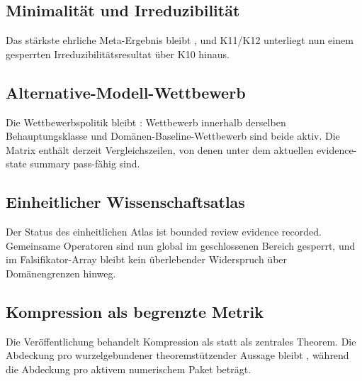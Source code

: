 \subsection{Minimalität und Irreduzibilität}
Das stärkste ehrliche Meta-Ergebnis bleibt , und K11/K12 unterliegt nun einem gesperrten Irreduzibilitätsresultat über K10 hinaus.

\subsection{Alternative-Modell-Wettbewerb}
Die Wettbewerbspolitik bleibt : Wettbewerb innerhalb derselben Behauptungsklasse und Domänen-Baseline-Wettbewerb sind beide aktiv. Die Matrix enthält derzeit  Vergleichszeilen, von denen  unter dem aktuellen evidence-state summary pass-fähig sind.

\subsection{Einheitlicher Wissenschaftsatlas}
Der Status des einheitlichen Atlas ist bounded review evidence recorded. Gemeinsame Operatoren sind nun global im geschlossenen Bereich gesperrt, und im Falsifikator-Array bleibt kein überlebender Widerspruch über Domänengrenzen hinweg.

\subsection{Kompression als begrenzte Metrik}
Die Veröffentlichung behandelt Kompression als  statt als zentrales Theorem.
Die Abdeckung pro wurzelgebundener theoremstützender Aussage bleibt , während die Abdeckung pro aktivem numerischem Paket  beträgt.
